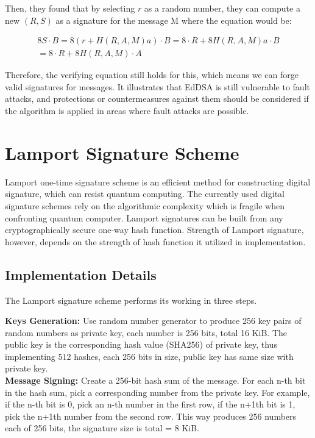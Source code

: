 \documentclass[10pt,sigconf]{acmart}
\begin{document}
Then, they found that by selecting $r$ as a random number, they can compute a new $(R, S)$ as a signature for the message M where the equation would be:

\begin{align*}
    8S \cdot B = 8(r + H(R,A,M) a) \cdot B = 8 \cdot R + 8H(R,A,M) a \cdot B \\
    = 8 \cdot R + 8H(R,A,M) \cdot A
\end{align*}


Therefore, the verifying equation still holds for this, which means we can forge valid signatures for messages. It illustrates that EdDSA is still vulnerable to fault attacks, and protections or countermeasures against them should be considered if the algorithm is applied in areas where fault attacks are possible.




\section{Lamport Signature Scheme}

Lamport one-time signature scheme is an efficient method for constructing digital signature, which can resist quantum computing. The currently used digital signature schemes rely on the algorithmic complexity which is fragile when confronting quantum computer. Lamport signatures can be built from any cryptographically secure one-way hash function. Strength of Lamport signature, however, depends on the strength of hash function it utilized in implementation.

\subsection{Implementation Details}

The Lamport signature scheme performs its working in three steps. 

\vspace{0.5em}

\noindent\textbf{Keys Generation:} \quad Use random number generator to produce 256 key pairs of random numbers as private key, each number is 256 bits, total 16 KiB. The public key is the corresponding hash value (SHA256) of private key, thus implementing 512 hashes, each 256 bits in size, public key has same size with private key.\\

\noindent\textbf{Message Signing:} \quad Create a 256-bit hash sum of the message. For each n-th bit in the hash sum, pick a corresponding number from the private key. For example, if the n-th bit is 0, pick an n-th number in the first row, if the n+1th bit is 1, pick the n+1th number from the second row. This way produces 256 numbers each of 256 bits, the signature size is total  = 8 KiB.\\
\end{document}
